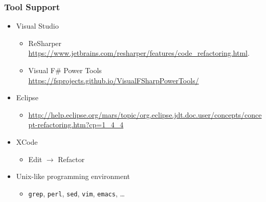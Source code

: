 \begin{frame}

\frametitle{Tool Support}

\begin{itemize}

\item Visual Studio

\begin{itemize}

\item ReSharper \url{https://www.jetbrains.com/resharper/features/code_refactoring.html}.

\item Visual F\# Power Tools
\url{https://fsprojects.github.io/VisualFSharpPowerTools/}

\end{itemize}

\item Eclipse

\begin{itemize}

\item
\url{http://help.eclipse.org/mars/topic/org.eclipse.jdt.doc.user/concepts/concept-refactoring.htm?cp=1_4_4}

\end{itemize}

\item XCode

\begin{itemize}

\item Edit $\rightarrow$ Refactor

\end{itemize}

\item Unix-like programming environment

\begin{itemize}

\item \texttt{grep}, \texttt{perl}, \texttt{sed}, \texttt{vim}, \texttt{emacs}, \ldots

\end{itemize}

\end{itemize}

\end{frame}
